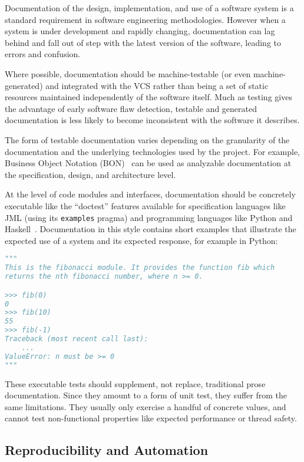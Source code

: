 Documentation of the design, implementation, and use of a software
system is a standard requirement in software engineering
methodologies. However when a system is under development and rapidly
changing, documentation can lag behind and fall out of step with the
latest version of the software, leading to errors and confusion.

Where possible, documentation should be machine-testable (or even
machine-generated) and integrated with the VCS rather than being a set
of static resources maintained independently of the software
itself. Much as testing gives the advantage of early software flaw
detection, testable and generated documentation is less likely to
become inconsistent with the software it describes.

The form of testable documentation varies depending on the granularity
of the documentation and the underlying technologies used by the
project. For example, Business Object Notation
(BON)~\cite{walden1995seamless} can be used as analyzable
documentation at the specification, design, and architecture level.

At the level of code modules and interfaces, documentation should be
concretely executable like the ``doctest'' features available for
specification languages like JML (using its \texttt{examples} pragma)
and programming languages like Python and
Haskell~\cite{python3doctest}. Documentation in this style contains
short examples that illustrate the expected use of a system and its
expected response, for example in Python:

\begin{lstlisting}[language=Python]
"""
This is the fibonacci module. It provides the function fib which
returns the nth fibonacci number, where n >= 0.

>>> fib(0)
0
>>> fib(10)
55
>>> fib(-1)
Traceback (most recent call last):
    ...
ValueError: n must be >= 0
"""
\end{lstlisting}

These executable tests should supplement, not replace, traditional
prose documentation. Since they amount to a form of unit test, they
suffer from the same limitations. They usually only exercise a handful
of concrete values, and cannot test non-functional properties like
expected performance or thread safety.

\subsection{Reproducibility and Automation}

